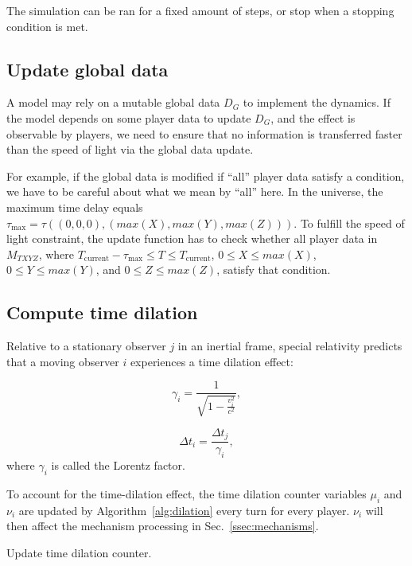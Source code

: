 \documentclass{svproc}
\begin{document}
The simulation can be ran for a fixed amount of steps, or stop when a stopping condition is met.

\subsection{Update global data} \label{ssec:global}

A model may rely on a mutable global data $D_G$ to implement the dynamics.
If the model depends on some player data to update $D_G$, 
and the effect is observable by players,
we need to ensure that no information is transferred faster than the speed of light via
the global data update.

For example, if the global data is modified if ``all'' player data satisfy a condition,
we have to be careful about what we mean by ``all'' here.
In the universe, the maximum time delay equals $\tau_{\textrm{max}} = \tau((0, 0, 0), (max(X), max(Y), max(Z)))$.
To fulfill the speed of light constraint, the update function has to check whether all player data in
$M_{TXYZ}$, where $T_{\textrm{current}} - \tau_{\textrm{max}} \leq T \leq T_{\textrm{current}}$,
$0 \leq X \leq max(X)$, $0 \leq Y \leq max(Y)$, and $0 \leq Z \leq max(Z)$,
satisfy that condition.

\subsection{Compute time dilation} \label{ssec:dilation}

Relative to a stationary observer $j$ in an inertial frame,
special relativity predicts that a moving observer $i$ experiences a time dilation effect:

\begin{equation} \label{eq:gamma}
  \gamma_i = \frac{1}{\sqrt{1 - \frac{v_i^2}{c^2}}},
\end{equation}

\begin{equation}
  \Delta t_i = \frac{\Delta t_j}{\gamma_i},
\end{equation}
where $\gamma_i$ is called the Lorentz factor.

To account for the time-dilation effect, 
the time dilation counter variables $\mu_i$ and $\nu_i$ are updated by Algorithm~\ref{alg:dilation}
every turn for every player. 
$\nu_{i}$ will then affect the mechanism processing in Sec.~\ref{ssec:mechanisms}.

\begin{algorithm}


\caption{Update time dilation counter.}
\label{alg:dilation}
\end{algorithm}
\end{document}
